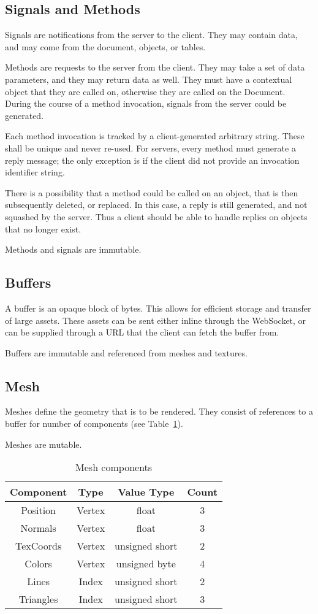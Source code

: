 \documentclass[11pt, oneside]{amsart}
\begin{document}
\subsection{Signals and Methods}
Signals are notifications from the server to the client. They may contain data, and may come from the document, objects, or tables.

Methods are requests to the server from the client. They may take a set of data parameters, and they may return data as well. They must have a contextual object that they are called on, otherwise they are called on the Document. During the course of a method invocation, signals from the server could be generated.

Each method invocation is tracked by a client-generated arbitrary string. These shall be unique and never re-used. For servers, every method must generate a reply message; the only exception is if the client did not provide an invocation identifier string.

There is a possibility that a method could be called on an object, that is then subsequently deleted, or replaced. In this case, a reply is still generated, and not squashed by the server. Thus a client should be able to handle replies on objects that no longer exist.

Methods and signals are immutable.

\subsection{Buffers}
A buffer is an opaque block of bytes. This allows for efficient storage and transfer of large assets. These assets can be sent either inline through the WebSocket, or can be supplied through a URL that the client can fetch the buffer from.

Buffers are immutable and referenced from meshes and textures.

\subsection{Mesh}
Meshes define the geometry that is to be rendered. They consist of references to a buffer for number of components (see Table~\ref{tab:mesh_comp}).

Meshes are mutable.

\begin{table}
	\begin{tabular}{cccc}
		\toprule
		\textbf{Component} & \textbf{Type} & \textbf{Value Type} & \textbf{Count} \\
		\midrule
		Position & Vertex & float & 3 \\
		Normals & Vertex & float & 3 \\
		TexCoords & Vertex & unsigned short & 2 \\
		Colors & Vertex & unsigned byte & 4 \\
		Lines & Index & unsigned short & 2 \\
		Triangles & Index & unsigned short & 3 \\
		\bottomrule
	\end{tabular}
	\caption{Mesh components}
	\label{tab:mesh_comp}
\end{table}
\end{document}
